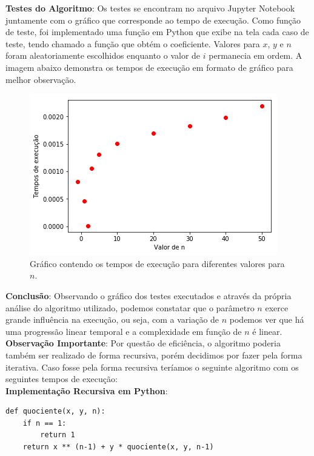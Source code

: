\documentclass{article}
\begin{document}
\pagebreak

\textbf{Testes do Algoritmo}: Os testes se encontram no arquivo Jupyter Notebook juntamente com o gráfico que corresponde ao tempo de execução. Como função de teste, foi implementado uma função em Python que exibe na tela cada caso de teste, tendo chamado a função que obtém o coeficiente. Valores para $x$, $y$ e $n$ foram aleatoriamente escolhidos enquanto o valor de $i$ permanecia em ordem. A imagem abaixo demonstra os tempos de execução em formato de gráfico para melhor observação.

\begin{figure}[!htb]
\centering
\includegraphics[scale=0.6]{GRAFICO.png}
\caption{Gráfico contendo os tempos de execução para diferentes valores para $n$.}
\end{figure}

\textbf{Conclusão}: Observando o gráfico dos testes executados e através da própria análise do algoritmo utilizado, podemos constatar que o parâmetro $n$ exerce grande influência na execução, ou seja, com a variação de $n$ podemos ver que há uma progressão linear temporal e a complexidade em função de $n$ é linear.\\

\textbf{Observação Importante}: Por questão de eficiência, o algoritmo poderia também ser realizado de forma recursiva, porém decidimos por fazer pela forma iterativa. Caso fosse pela forma recursiva teríamos o seguinte algoritmo com os seguintes tempos de execução:\\

\textbf{Implementação Recursiva em Python}:

{\color{red}
\begin{verbatim}
def quociente(x, y, n):
    if n == 1:
        return 1
    return x ** (n-1) + y * quociente(x, y, n-1)
\end{verbatim}
}
\end{document}
